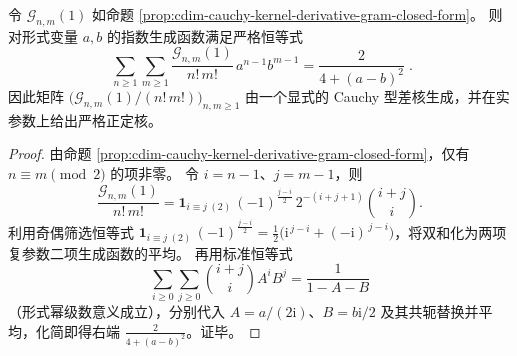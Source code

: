 \begin{proposition}\label{prop:cdim-cauchy-derivative-gram-exponential-kernel}
令 \(\mathcal G_{n,m}(1)\) 如命题 \ref{prop:cdim-cauchy-kernel-derivative-gram-closed-form}。
则对形式变量 \(a,b\) 的指数生成函数满足严格恒等式
\[
\boxed{\;
\sum_{n\ge 1}\sum_{m\ge 1}\frac{\mathcal G_{n,m}(1)}{n!\,m!}\,a^{n-1}b^{m-1}
=\frac{2}{4+(a-b)^2}\; }.
\]
因此矩阵 \(\bigl(\mathcal G_{n,m}(1)/(n!\,m!)\bigr)_{n,m\ge 1}\) 由一个显式的 Cauchy 型差核生成，并在实参数上给出严格正定核。
\end{proposition}
\begin{proof}
由命题 \ref{prop:cdim-cauchy-kernel-derivative-gram-closed-form}，仅有 \(n\equiv m\pmod 2\) 的项非零。
令 \(i=n-1\)、\(j=m-1\)，则
\[
\frac{\mathcal G_{n,m}(1)}{n!\,m!}
=\mathbf 1_{i\equiv j\ (2)}\,(-1)^{\frac{j-i}{2}}\,2^{-(i+j+1)}\binom{i+j}{i}.
\]
利用奇偶筛选恒等式
\(
\mathbf 1_{i\equiv j\ (2)}\,(-1)^{\frac{j-i}{2}}=\frac12\bigl(\mathrm{i}^{\,j-i}+(-\mathrm{i})^{\,j-i}\bigr)
\)，将双和化为两项复参数二项生成函数的平均。
再用标准恒等式
\[
\sum_{i\ge 0}\sum_{j\ge 0}\binom{i+j}{i}A^iB^j=\frac{1}{1-A-B}
\]
（形式幂级数意义成立），分别代入 \(A=a/(2\mathrm{i})\)、\(B=b\mathrm{i}/2\) 及其共轭替换并平均，化简即得右端 \(\frac{2}{4+(a-b)^2}\)。证毕。
\end{proof}

